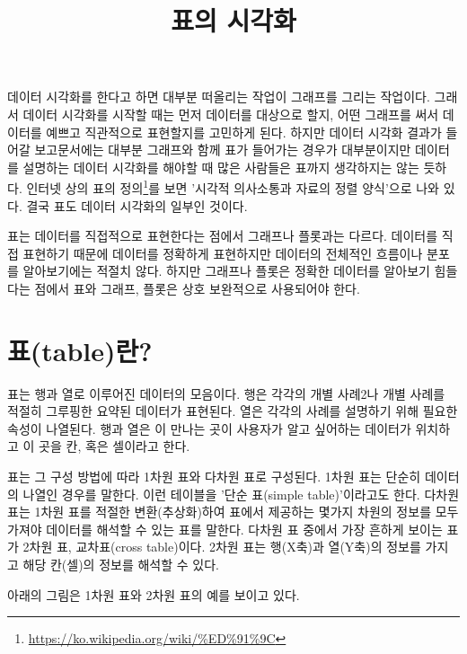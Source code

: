 \documentclass[
]{article}
\title{표의 시각화}
\author{}
\date{\vspace{-2.5em}}
\begin{document}
\maketitle

데이터 시각화를 한다고 하면 대부분 떠올리는 작업이 그래프를 그리는
작업이다. 그래서 데이터 시각화를 시작할 때는 먼저 데이터를 대상으로
할지, 어떤 그래프를 써서 데이터를 예쁘고 직관적으로 표현할지를 고민하게
된다. 하지만 데이터 시각화 결과가 들어갈 보고문서에는 대부분 그래프와
함께 표가 들어가는 경우가 대부분이지만 데이터를 설명하는 데이터 시각화를
해야할 때 많은 사람들은 표까지 생각하지는 않는 듯하다. 인터넷 상의 표의
정의\footnote{\url{https://ko.wikipedia.org/wiki/\%ED\%91\%9C}}를 보면
'시각적 의사소통과 자료의 정렬 양식'으로 나와 있다. 결국 표도 데이터
시각화의 일부인 것이다.

표는 데이터를 직접적으로 표현한다는 점에서 그래프나 플롯과는 다르다.
데이터를 직접 표현하기 때문에 데이터를 정확하게 표현하지만 데이터의
전체적인 흐름이나 분포를 알아보기에는 적절치 않다. 하지만 그래프나
플롯은 정확한 데이터를 알아보기 힘들다는 점에서 표와 그래프, 플롯은 상호
보완적으로 사용되어야 한다.

\hypertarget{uxd45ctableuxb780}{%
\section{표(table)란?}\label{uxd45ctableuxb780}}

표는 행과 열로 이루어진 데이터의 모음이다. 행은 각각의 개별 사례2나 개별
사례를 적절히 그루핑한 요약된 데이터가 표현된다. 열은 각각의 사례를
설명하기 위해 필요한 속성이 나열된다. 행과 열은 이 만나는 곳이 사용자가
알고 싶어하는 데이터가 위치하고 이 곳을 칸, 혹은 셀이라고 한다.

표는 그 구성 방법에 따라 1차원 표와 다차원 표로 구성된다. 1차원 표는
단순히 데이터의 나열인 경우를 말한다. 이런 테이블을 '단순 표(simple
table)'이라고도 한다. 다차원 표는 1차원 표를 적절한 변환(추상화)하여
표에서 제공하는 몇가지 차원의 정보를 모두 가져야 데이터를 해석할 수 있는
표를 말한다. 다차원 표 중에서 가장 흔하게 보이는 표가 2차원 표,
교차표(cross table)이다. 2차원 표는 행(X축)과 열(Y축)의 정보를 가지고
해당 칸(셀)의 정보를 해석할 수 있다.

아래의 그림은 1차원 표와 2차원 표의 예를 보이고 있다.
\end{document}

